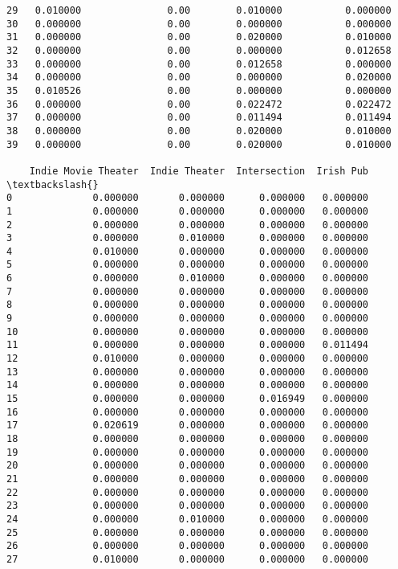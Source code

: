 \documentclass[11pt]{article}
\begin{document}
\begin{tcolorbox}[breakable, size=fbox, boxrule=.5pt, pad at break*=1mm, opacityfill=0]
\begin{Verbatim}[commandchars=\\\{\}]
29   0.010000               0.00        0.010000           0.000000
30   0.000000               0.00        0.000000           0.000000
31   0.000000               0.00        0.020000           0.010000
32   0.000000               0.00        0.000000           0.012658
33   0.000000               0.00        0.012658           0.000000
34   0.000000               0.00        0.000000           0.020000
35   0.010526               0.00        0.000000           0.000000
36   0.000000               0.00        0.022472           0.022472
37   0.000000               0.00        0.011494           0.011494
38   0.000000               0.00        0.020000           0.010000
39   0.000000               0.00        0.020000           0.010000

    Indie Movie Theater  Indie Theater  Intersection  Irish Pub  \textbackslash{}
0              0.000000       0.000000      0.000000   0.000000
1              0.000000       0.000000      0.000000   0.000000
2              0.000000       0.000000      0.000000   0.000000
3              0.000000       0.010000      0.000000   0.000000
4              0.010000       0.000000      0.000000   0.000000
5              0.000000       0.000000      0.000000   0.000000
6              0.000000       0.010000      0.000000   0.000000
7              0.000000       0.000000      0.000000   0.000000
8              0.000000       0.000000      0.000000   0.000000
9              0.000000       0.000000      0.000000   0.000000
10             0.000000       0.000000      0.000000   0.000000
11             0.000000       0.000000      0.000000   0.011494
12             0.010000       0.000000      0.000000   0.000000
13             0.000000       0.000000      0.000000   0.000000
14             0.000000       0.000000      0.000000   0.000000
15             0.000000       0.000000      0.016949   0.000000
16             0.000000       0.000000      0.000000   0.000000
17             0.020619       0.000000      0.000000   0.000000
18             0.000000       0.000000      0.000000   0.000000
19             0.000000       0.000000      0.000000   0.000000
20             0.000000       0.000000      0.000000   0.000000
21             0.000000       0.000000      0.000000   0.000000
22             0.000000       0.000000      0.000000   0.000000
23             0.000000       0.000000      0.000000   0.000000
24             0.000000       0.010000      0.000000   0.000000
25             0.000000       0.000000      0.000000   0.000000
26             0.000000       0.000000      0.000000   0.000000
27             0.010000       0.000000      0.000000   0.000000

\end{Verbatim}
\end{tcolorbox}
\end{document}
